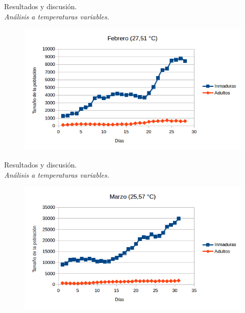 \begin{frame}[t]{Resultados y discusión.\\\textit{Análisis a temperaturas variables.}}
    \begin{figure}
    \includegraphics[width=\textwidth]{./graphics/py-2010-febrero.png}
    \end{figure}
\end{frame}

\begin{frame}[t]{Resultados y discusión.\\\textit{Análisis a temperaturas variables.}}
    \begin{figure}
    \includegraphics[width=\textwidth]{./graphics/py-2010-marzo.png}
    \end{figure}
\end{frame}

